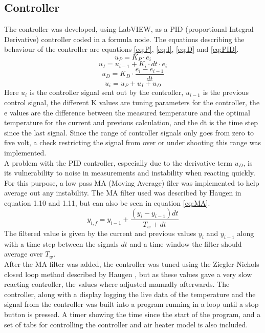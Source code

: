 \documentclass[11pt, A4paper, english]{article}
\numberwithin{equation}{section}
\begin{document}
\begin{multicols}{2}
		\subsection{Controller}
The controller was developed, using LabVIEW, as a PID (proportional Integral Derivative) controller coded in a formula node. The equations describing the behaviour of the controller are equations \ref{eq:P}, \ref{eq:I}, \ref{eq:D} and \ref{eq:PID}.
			\begin{equation}
u_P = K_P \cdot e_i
\label{eq:P}
			\end{equation}
			\begin{equation}
u_I = u_{i - 1} + K_i \cdot dt \cdot e_i
\label{eq:I}
			\end{equation}
			\begin{equation}
u_D = K_D \cdot \frac{e_i - e_{i - 1}}{dt}
\label{eq:D}
			\end{equation}
			\begin{equation}
u_i = u_P + u_I + u_D
\label{eq:PID}
			\end{equation}
Here $u_i$ is the controller signal sent out by the controller, $u_{i - 1}$ is the previous control signal, the different K values are tuning parameters for the controller, the e values are the difference between the measured temperature and the optimal temperature for the current and previous calculation, and the dt is the time step since the last signal. Since the range of controller signals only goes from zero to five volt, a check restricting the signal from over or under shooting this range was implemented. \\
A problem with the PID controller, especially due to the derivative term $u_D$, is its vulnerability to noise in measurements and instability when reacting quickly. For this purpose, a low pass MA (Moving Average) filer was implemented to help average out any instability. The MA filter used was described by Haugen \cite{MA} in equation 1.10 and 1.11, but can also be seen in equation \ref{eq:MA}.
			\begin{equation}
y_{i, f} = y_{i - 1} + \frac{(y_i - y_{i - 1}) dt}{T_w + dt}
\label{eq:MA}
			\end{equation}
The filtered value is given by the current and previous values $y_i$ and $y_{i - 1}$ along with a time step between the signals $dt$ and a time window the filter should average over $T_w$. \\
After the MA filter was added, the controller was tuned using the Ziegler-Nichols closed loop method described by Haugen \cite{MA}, but as these values gave a very slow reacting controller, the values where adjusted manually afterwards.
The controller, along with a display logging the live data of the temperature and the signal from the controller was built into a program running in a loop until a stop button is pressed. A timer showing the time since the start of the program, and a set of tabs for controlling the controller and air heater model is also included.
		

\end{multicols}
\end{document}
